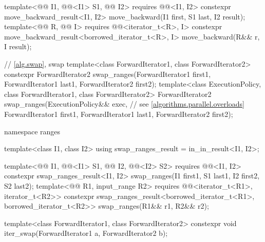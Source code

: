 \begin{codeblock}
{{    template<@@ I1, @@<I1> S1, @@ I2>
      requires @@<I1, I2>
      constexpr move_backward_result<I1, I2>
        move_backward(I1 first, S1 last, I2 result);
    template<@@ R, @@ I>
      requires @@<iterator_t<R>, I>
      constexpr move_backward_result<borrowed_iterator_t<R>, I>
        move_backward(R&& r, I result);
  }

  // \ref{alg.swap}, swap
  template<class ForwardIterator1, class ForwardIterator2>
    constexpr ForwardIterator2 swap_ranges(ForwardIterator1 first1, ForwardIterator1 last1,
                                           ForwardIterator2 first2);
  template<class ExecutionPolicy, class ForwardIterator1, class ForwardIterator2>
    ForwardIterator2 swap_ranges(ExecutionPolicy&& exec,        // see \ref{algorithms.parallel.overloads}
                                 ForwardIterator1 first1, ForwardIterator1 last1,
                                 ForwardIterator2 first2);

  namespace ranges {
    template<class I1, class I2>
      using swap_ranges_result = in_in_result<I1, I2>;

    template<@@ I1, @@<I1> S1, @@ I2, @@<I2> S2>
      requires @@<I1, I2>
      constexpr swap_ranges_result<I1, I2>
        swap_ranges(I1 first1, S1 last1, I2 first2, S2 last2);
    template<@@ R1, input_range R2>
      requires @@<iterator_t<R1>, iterator_t<R2>>
      constexpr swap_ranges_result<borrowed_iterator_t<R1>, borrowed_iterator_t<R2>>
        swap_ranges(R1&& r1, R2&& r2);
  }

  template<class ForwardIterator1, class ForwardIterator2>
    constexpr void iter_swap(ForwardIterator1 a, ForwardIterator2 b);

}
\end{codeblock}
